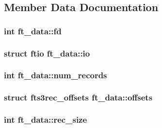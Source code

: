 \subsection{\-Member \-Data \-Documentation}
\hypertarget{structft__data_a6a6288892831b358a2f899cf3182467d}{
\subsubsection[{fd}]{\setlength{\rightskip}{0pt plus 5cm}int {\bf ft\-\_\-data\-::fd}}}\label{structft__data_a6a6288892831b358a2f899cf3182467d}
\hypertarget{structft__data_ab6231c0f90cc6f0dd190d52d6926d54b}{
\subsubsection[{io}]{\setlength{\rightskip}{0pt plus 5cm}struct ftio {\bf ft\-\_\-data\-::io}}}\label{structft__data_ab6231c0f90cc6f0dd190d52d6926d54b}
\hypertarget{structft__data_a0ee5c9e9e607138986705fe248e54e7b}{
\subsubsection[{num\-\_\-records}]{\setlength{\rightskip}{0pt plus 5cm}int {\bf ft\-\_\-data\-::num\-\_\-records}}}\label{structft__data_a0ee5c9e9e607138986705fe248e54e7b}
\hypertarget{structft__data_a4e2b828b9122744d5cb7fb509d849679}{
\subsubsection[{offsets}]{\setlength{\rightskip}{0pt plus 5cm}struct fts3rec\-\_\-offsets {\bf ft\-\_\-data\-::offsets}}}\label{structft__data_a4e2b828b9122744d5cb7fb509d849679}
\hypertarget{structft__data_a1512d3bba878f9017d2ce6a5881f38b9}{
\subsubsection[{rec\-\_\-size}]{\setlength{\rightskip}{0pt plus 5cm}int {\bf ft\-\_\-data\-::rec\-\_\-size}}}\label{structft__data_a1512d3bba878f9017d2ce6a5881f38b9}
